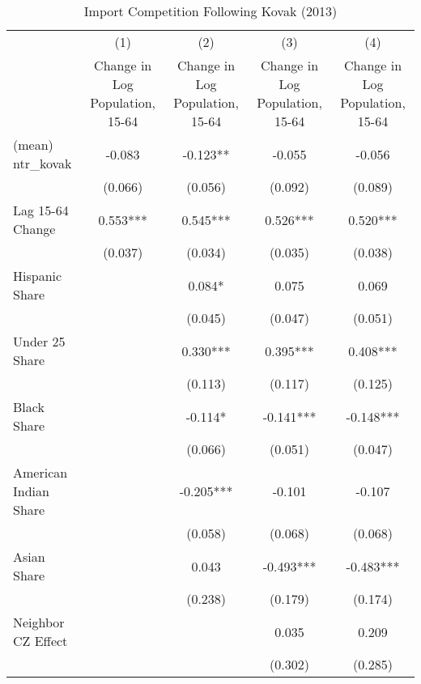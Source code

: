 \begin{table}[htbp]\centering
\def\sym#1{\ifmmode^{#1}\else\(^{#1}\)\fi}
\caption{Import Competition Following Kovak (2013)}
\begin{tabular}{l*{4}{c}}
\toprule
                    &\multicolumn{1}{c}{(1)}&\multicolumn{1}{c}{(2)}&\multicolumn{1}{c}{(3)}&\multicolumn{1}{c}{(4)}\\
                    &\multicolumn{1}{c}{Change in Log Population, 15-64}&\multicolumn{1}{c}{Change in Log Population, 15-64}&\multicolumn{1}{c}{Change in Log Population, 15-64}&\multicolumn{1}{c}{Change in Log Population, 15-64}\\
\midrule
(mean) ntr\_kovak    &   -0.083   &   -0.123** &   -0.055   &   -0.056   \\
                    &  (0.066)   &  (0.056)   &  (0.092)   &  (0.089)   \\
\addlinespace
Lag 15-64 Change    &    0.553***&    0.545***&    0.526***&    0.520***\\
                    &  (0.037)   &  (0.034)   &  (0.035)   &  (0.038)   \\
\addlinespace
Hispanic Share      &            &    0.084*  &    0.075   &    0.069   \\
                    &            &  (0.045)   &  (0.047)   &  (0.051)   \\
\addlinespace
Under 25 Share      &            &    0.330***&    0.395***&    0.408***\\
                    &            &  (0.113)   &  (0.117)   &  (0.125)   \\
\addlinespace
Black Share         &            &   -0.114*  &   -0.141***&   -0.148***\\
                    &            &  (0.066)   &  (0.051)   &  (0.047)   \\
\addlinespace
American Indian Share&            &   -0.205***&   -0.101   &   -0.107   \\
                    &            &  (0.058)   &  (0.068)   &  (0.068)   \\
\addlinespace
Asian Share         &            &    0.043   &   -0.493***&   -0.483***\\
                    &            &  (0.238)   &  (0.179)   &  (0.174)   \\
\addlinespace
Neighbor CZ Effect  &            &            &    0.035   &    0.209   \\
                    &            &            &  (0.302)   &  (0.285)   \\

\end{tabular}
\end{table}
